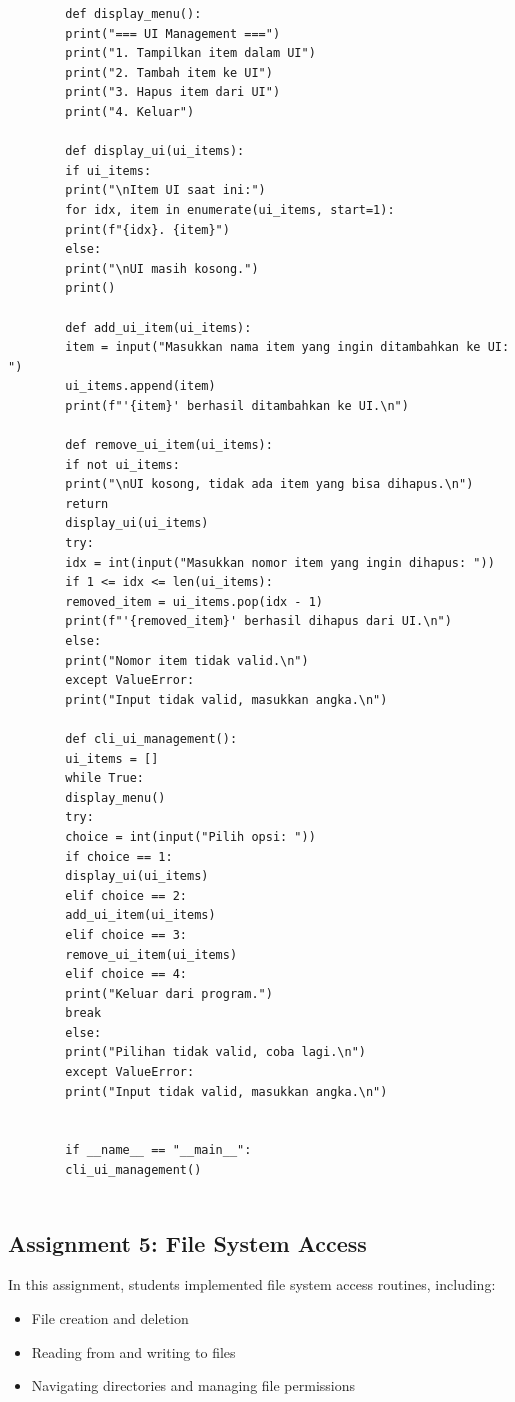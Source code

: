 \documentclass[12pt]{article}
\begin{document}
	
	\begin{lstlisting}
		def display_menu():
		print("=== UI Management ===")
		print("1. Tampilkan item dalam UI")
		print("2. Tambah item ke UI")
		print("3. Hapus item dari UI")
		print("4. Keluar")
		
		def display_ui(ui_items):
		if ui_items:
		print("\nItem UI saat ini:")
		for idx, item in enumerate(ui_items, start=1):
		print(f"{idx}. {item}")
		else:
		print("\nUI masih kosong.")
		print()
		
		def add_ui_item(ui_items):
		item = input("Masukkan nama item yang ingin ditambahkan ke UI: ")
		ui_items.append(item)
		print(f"'{item}' berhasil ditambahkan ke UI.\n")
		
		def remove_ui_item(ui_items):
		if not ui_items:
		print("\nUI kosong, tidak ada item yang bisa dihapus.\n")
		return
		display_ui(ui_items)
		try:
		idx = int(input("Masukkan nomor item yang ingin dihapus: "))
		if 1 <= idx <= len(ui_items):
		removed_item = ui_items.pop(idx - 1)
		print(f"'{removed_item}' berhasil dihapus dari UI.\n")
		else:
		print("Nomor item tidak valid.\n")
		except ValueError:
		print("Input tidak valid, masukkan angka.\n")
		
		def cli_ui_management():
		ui_items = []
		while True:
		display_menu()
		try:
		choice = int(input("Pilih opsi: "))
		if choice == 1:
		display_ui(ui_items)
		elif choice == 2:
		add_ui_item(ui_items)
		elif choice == 3:
		remove_ui_item(ui_items)
		elif choice == 4:
		print("Keluar dari program.")
		break
		else:
		print("Pilihan tidak valid, coba lagi.\n")
		except ValueError:
		print("Input tidak valid, masukkan angka.\n")
		
		
		if __name__ == "__main__":
		cli_ui_management()
		
	\end{lstlisting}
	
	
	\subsection{Assignment 5: File System Access}
	In this assignment, students implemented file system access routines, including:
	\begin{itemize}
		\item File creation and deletion
		\item Reading from and writing to files
		\item Navigating directories and managing file permissions
	\end{itemize}
\end{document}
